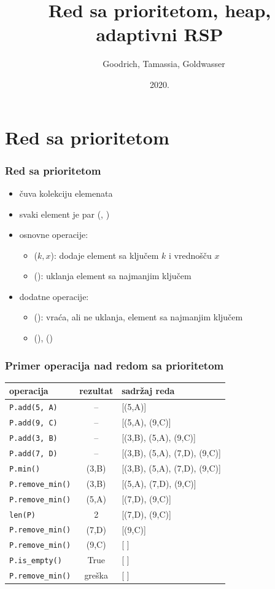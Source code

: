 \documentclass[compress,aspectratio=169]{beamer}
\title{Red sa prioritetom, heap, adaptivni RSP}
\author{\textcopyright \ \ Goodrich, Tamassia, Goldwasser}
\institute{Katedra za informatiku, Fakultet tehničkih nauka, Univerzitet u
Novom Sadu}
\date{2020.}
\begin{document}
\frame{\titlepage}

\section[Red sa prioritetom]{Red sa prioritetom}
\begin{frame}[fragile]
  \frametitle{Red sa prioritetom}
  \begin{itemize}
    \item {} čuva kolekciju elemenata 
    \item svaki element je par (, )
    \item osnovne operacije:
    \begin{itemize}
      \item {}($k, x$): dodaje element sa ključem $k$ i vrednošču $x$
      \item {}(): uklanja element sa najmanjim ključem 
    \end{itemize}
    \item dodatne operacije:
    \begin{itemize}
      \item {}(): vraća, ali ne uklanja, element sa najmanjim ključem
      \item {}(), () 
    \end{itemize}
  \end{itemize}
\end{frame}

\begin{frame}[fragile,shrink=10]
  \frametitle{Primer operacija nad redom sa prioritetom}
\begin{center}
\begin{tabular}{lcl}
\textbf{operacija} & \textbf{rezultat} & \textbf{sadržaj reda} \\
\hline \hline
\texttt{P.add(5, A)} & -- & [(5,A)] \\ 
\texttt{P.add(9, C)} & -- & [(5,A), (9,C)] \\ 
\texttt{P.add(3, B)} & -- & [(3,B), (5,A), (9,C)] \\ 
\texttt{P.add(7, D)} & -- & [(3,B), (5,A), (7,D), (9,C)] \\ 
\texttt{P.min()} & (3,B) & [(3,B), (5,A), (7,D), (9,C)] \\ 
\texttt{P.remove\_min()} & (3,B) & [(5,A), (7,D), (9,C)] \\ 
\texttt{P.remove\_min()} & (5,A) & [(7,D), (9,C)] \\ 
\texttt{len(P)} & 2 & [(7,D), (9,C)] \\
\texttt{P.remove\_min()} & (7,D) & [(9,C)] \\ 
\texttt{P.remove\_min()} & (9,C) & [ ] \\ 
\texttt{P.is\_empty()} & True & [ ] \\ 
\texttt{P.remove\_min()} & greška & [ ]
\end{tabular}
\end{center}
\end{frame}
\end{document}
